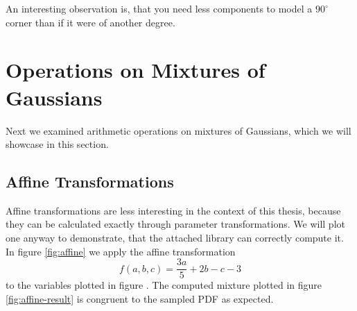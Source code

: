 \documentclass[11pt,a4paper]{book}
\begin{document}
An interesting observation is, that you need less components to model a
$90^{\circ}$ corner than if it were of another degree.

\section{Operations on Mixtures of Gaussians}

Next we examined arithmetic operations on mixtures of Gaussians, which we will
showcase in this section.

\subsection{Affine Transformations}

Affine transformations are less interesting in the context of this thesis,
because they can be calculated exactly through parameter transformations. We
will plot one anyway to demonstrate, that the attached library can correctly
compute it. In figure \ref{fig:affine} we apply the affine transformation
\begin{equation*}
  f(a, b, c) = \frac{3a}{5} + 2b - c - 3
\end{equation*}
to the variables plotted in figure \label{fig:affine-vars}. The computed mixture
plotted in figure \ref{fig:affine-result} is congruent to the sampled PDF as
expected.
\end{document}
